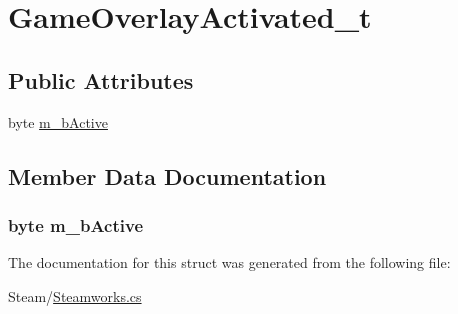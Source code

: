 \hypertarget{structSteamworks_1_1GameOverlayActivated__t}{}\section{Game\+Overlay\+Activated\+\_\+t}
\label{structSteamworks_1_1GameOverlayActivated__t}
\subsection*{Public Attributes}
\begin{DoxyCompactItemize}
\item 
byte \hyperlink{structSteamworks_1_1GameOverlayActivated__t_abe6d530af6263c80d6a91a26a5d85918}{m\+\_\+b\+Active}
\end{DoxyCompactItemize}


\subsection{Member Data Documentation}
\hypertarget{structSteamworks_1_1GameOverlayActivated__t_abe6d530af6263c80d6a91a26a5d85918}{}
\subsubsection[{m\+\_\+b\+Active}]{\setlength{\rightskip}{0pt plus 5cm}byte m\+\_\+b\+Active}\label{structSteamworks_1_1GameOverlayActivated__t_abe6d530af6263c80d6a91a26a5d85918}


The documentation for this struct was generated from the following file\+:\begin{DoxyCompactItemize}
\item 
Steam/\hyperlink{Steamworks_8cs}{Steamworks.\+cs}\end{DoxyCompactItemize}
